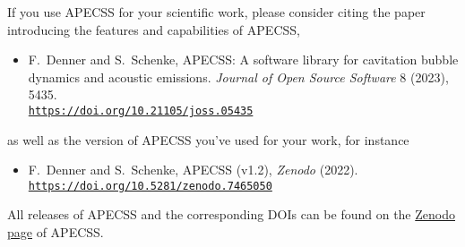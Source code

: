 If you use APECSS for your scientific work, please consider citing the paper introducing the features and capabilities of APECSS,\vspace{-0.5em}
\begin{itemize}[leftmargin=*]
  \item[] F.~Denner and S.~Schenke, APECSS: A software library for cavitation bubble dynamics and acoustic emissions. \textit{Journal of Open Source Software} 8 (2023), 5435. \\ \href{https://doi.org/10.21105/joss.05435}{\texttt{https://doi.org/10.21105/joss.05435}} 
\end{itemize}\vspace{-0.5em}
as well as the version of APECSS you've used for your work, for instance\vspace{-0.5em}
\begin{itemize}[leftmargin=*]
  \item[] F.~Denner and S.~Schenke, APECSS (v1.2), \textit{Zenodo} (2022). \\ \href{https://doi.org/10.5281/zenodo.7465050}{\texttt{https://doi.org/10.5281/zenodo.7465050}}
\end{itemize}\vspace{-0.5em}
All releases of APECSS and the corresponding DOIs can be found on the \href{https://doi.org/10.5281/zenodo.7249297}{Zenodo page} of APECSS.



